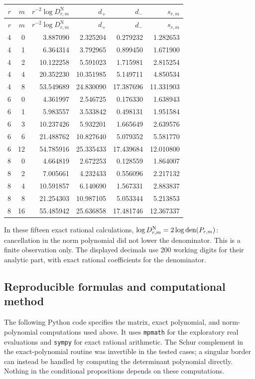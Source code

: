 \documentclass[11pt,a4paper]{article}
\theoremstyle{definition}
\theoremstyle{remark}
\begin{document}
\begin{center}
\small
\begin{longtable}{r r r r r r}
\hline
$r$&$m$&$r^{-2}\log D_{r,m}^{\mathrm N}$&$d_+$&$d_-$&$s_{r,m}$\\
\hline
\endfirsthead
\hline
$r$&$m$&$r^{-2}\log D_{r,m}^{\mathrm N}$&$d_+$&$d_-$&$s_{r,m}$\\
\hline
\endhead
4&0&3.887090&2.325204&0.279232&1.282653\\
4&1&6.364314&3.792965&0.899450&1.671900\\
4&2&10.122258&5.591023&1.715981&2.815254\\
4&4&20.352230&10.351985&5.149711&4.850534\\
4&8&53.549689&24.830090&17.387696&11.331903\\
\hline
6&0&4.361997&2.546725&0.176330&1.638943\\
6&1&5.983557&3.533842&0.498131&1.951584\\
6&3&10.237426&5.932201&1.665649&2.639576\\
6&6&21.488762&10.827640&5.079352&5.581770\\
6&12&54.785916&25.335433&17.439684&12.010800\\
\hline
8&0&4.664819&2.672253&0.128559&1.864007\\
8&2&7.005661&4.232433&0.556096&2.217132\\
8&4&10.591857&6.140690&1.567331&2.883837\\
8&8&21.254303&10.987105&5.053344&5.213853\\
8&16&55.485942&25.636858&17.481746&12.367337\\
\hline
\end{longtable}
\end{center}

In these fifteen exact rational calculations,
$\log D_{r,m}^{\mathrm N}=2\log\operatorname{den}(P_{r,m})$: cancellation in the
norm polynomial did not lower the denominator.  This is a finite
observation only.  The displayed decimals use 200 working digits for
their analytic part, with exact rational coefficients for the denominator.

\subsection{Reproducible formulas and computational method}
\label{f-sub-reproducibility}

The following Python code specifies the matrix, exact polynomial, and
norm-polynomial computations used above.  It uses \texttt{mpmath} for
the exploratory real evaluations and \texttt{sympy} for exact rational
arithmetic.  The Schur complement in the exact-polynomial routine was
invertible in the tested cases; a singular border can instead be handled
by computing the determinant polynomial directly.  Nothing in the
conditional propositions depends on these computations.
\end{document}
